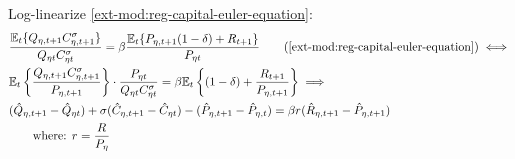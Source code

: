 \documentclass[../thesis.tex]{subfiles}
\begin{document}
Log-linearize \ref{ext-mod:reg-capital-euler-equation}:
\begin{align}
	& \frac{\mathbb{E}_{t} \{ Q_{\eta,t+1} C_{\eta,t+1}^{\sigma} \} }{ Q_{\eta t} C_{\eta t}^{\sigma} } = \beta \frac{ \mathbb{E}_{t} \{ P_{\eta,t+1} (1 - \delta) + R_{t+1} \} }{P_{\eta t}} \tag{\ref{ext-mod:reg-capital-euler-equation}} \iff \\
	& \mathbb{E}_{t} \left\{ \frac{Q_{\eta,t+1} C_{\eta,t+1}^{\sigma}}{P_{\eta,t+1}} \right\} \cdot \frac{P_{\eta t}}{Q_{\eta t} C_{\eta t}^{\sigma}} = \beta \mathbb{E}_{t} \left\{ (1 - \delta) + \frac{R_{t+1}}{P_{\eta, t+1}} \right\} \implies \nonumber \\
	& (\hat{Q}_{\eta, t+1} - \hat{Q}_{\eta t}) + \sigma(\hat{C}_{\eta, t+1} - \hat{C}_{\eta t}) - (\hat{P}_{\eta, t+1} - \hat{P}_{\eta, t}) = \beta r_{}(\hat{R}_{\eta, t+1} - \hat{P}_{\eta, t+1}) \label{ext-mod:reg-ll-capital-euler-equation} \\
	& \qquad \text{where: } r_{} = \frac{R_{}}{P_{\eta}} \label{ext-mod:reg-rk}
\end{align}

\begin{comment}

\begin{align}
	& \mathbb{E}_{t} \left\{ \frac{Q_{\eta,t+1} C_{\eta,t+1}^{\sigma}}{P_{\eta,t+1}} \right\}
	\cdot \frac{P_{\eta t}}{Q_{\eta t} C_{\eta t}^{\sigma}} = \beta \mathbb{E}_{t} \left\{ (1 - \delta) + $\frac{R_{t+1}}{P_{\eta, t+1}}$ \right\} \nonumber
	\\
	& \frac{P_{\eta t} C_{\eta t}^{1-\sigma}}{Q_{\eta t}} \mathbb{E}_t \left\{ \frac{\te[t+1]}{P_{\eta, t+1} C_{\eta, t+1}^{1-\sigma}} \right\} = \beta \left[ (1-\delta) + \mathbb{E}_t \left\{ \frac{R_{K,t+1}}{P_{\eta, t+1}} \right\} \right] \implies \nonumber \\
	& \frac{P_{\eta} C_{\eta}^{1-\sigma}}{\te[]} \cdot \frac{\te[]}{P_{\eta} C_{\eta}^{1-\sigma}} (1 + \hat{P}_{\eta t} + (1 -\sigma) \hat{C}_{\eta t} - \hat{\mathscr{E}}_{\eta t} + \nonumber \\ 
	& \qquad + \E \{\hat{\mathscr{E}}_{\eta, t+1} - \hat{P}_{\eta, t+1} - (1 -\sigma) \hat{C}_{\eta, t+1}\}) = \nonumber \\
	& \qquad = \beta \left[ (1-\delta) + \frac{R_{}}{P_{\eta}} \mathbb{E}_t \left\{ 1 + \hat{R}_{K, t+1} -\hat{P}_{\eta, t+1} \right\} \right] \implies \nonumber \\
	& \E \left\{ \hat{\mathscr{E}}_{\eta, t+1} - \hat{P}_{\eta, t+1}  - (1 -\sigma) \hat{C}_{\eta, t+1} \right\} - (\hat{\mathscr{E}}_{\eta t} - \hat{P}_{\eta t} - (1 -\sigma) \hat{C}_{\eta t}) = \nonumber \\
	& \qquad = \beta R_{} \mathbb{E}_t \left\{ \hat{R}_{K, t+1} - \hat{P}_{\eta, t+1} \right\} \label{ext-mod:reg-ll-capital-euler-equation} \\
	& \qquad \text{where: } R_{} = \frac{R_{}}{P_{}} \label{ext-mod:reg-rk}
\end{align}
	
\end{comment}
\end{document}
